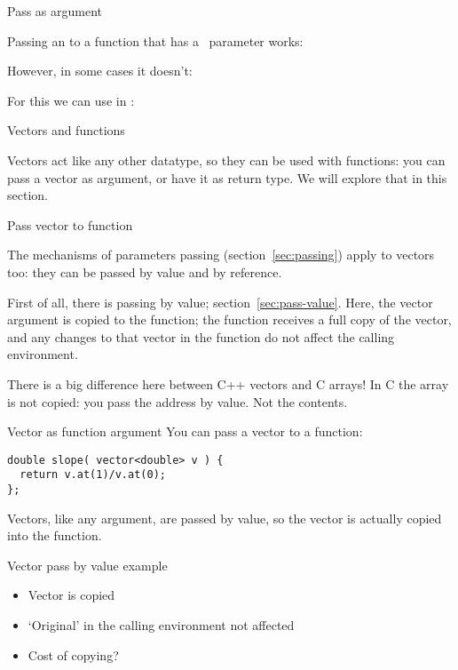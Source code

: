  {Pass as argument}

Passing an  to a function that has
a~ parameter works:

However, in some cases it doesn't:

For this we can use  in :

 {Vectors and functions}

Vectors act like any other datatype, so they can be used with functions:
you can pass a vector as argument, or have it as return type.
We will explore that in this section.

 {Pass vector to function}

The mechanisms of parameters passing (section~\ref{sec:passing})
apply to vectors too: they can be passed by value and by reference.

First of all, there is passing by value; section~\ref{sec:pass-value}.
Here, the vector argument is copied to the function;
the function receives a full copy of the vector,
and any changes to that vector in the function
do not affect the calling environment.

\begin{cnote}
  There is a big difference here between C++ vectors and C arrays!
  In C the array is not copied: you pass the address by value. Not the contents.
\end{cnote}

\begin{slide}{Vector as function argument}
  \label{sl:vector-arg}
  You can pass a vector to a function:
\begin{lstlisting}
double slope( vector<double> v ) {
  return v.at(1)/v.at(0);
};
\end{lstlisting}
Vectors, like any argument, are passed by value, so the vector is
actually copied into the function.
\end{slide}

\begin{block}{Vector pass by value example}
  \label{sl:vector-arg-ex}
  \begin{itemize}
  \item Vector is copied
  \item `Original' in the calling environment not affected
  \item Cost of copying?
  \end{itemize}
\end{block}

